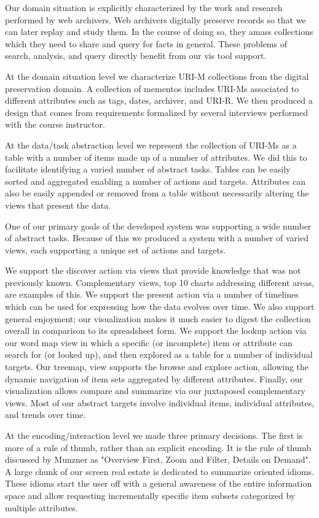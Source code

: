 \documentclass[10pt,journal,compsoc]{IEEEtran}
\begin{document}
Our domain situation is explicitly characterized by the work and research performed by web archivers. 
Web archivers digitally preserve records so that we can later replay and study them. 
In the course of doing so, they amass collections which they need to share and 
query for facts in general. These problems of search, analysis, and query directly 
benefit from our vis tool support. 

At the domain situation level we characterize URI-M collections from the digital preservation domain.
A collection of mementos includes URI-Ms associated to different attributes such as tags, dates, archiver, 
and URI-R. We then produced a design that comes from requirements formalized by several interviews performed 
with the course instructor.

At the data/task abstraction level we represent the collection of URI-Ms as a table
with a number of items made up of a number of attributes. We did this to facilitate 
identifying a varied number of abstract tasks. Tables can be easily sorted and aggregated
enabling a number of actions and targets. Attributes can also be easily appended or removed
from a table without necessarily altering the views that present the data.

One of our primary goals of the developed system was supporting a wide number of abstract tasks. Because of this
we produced a system with a number of varied views, each supporting a unique set of
actions and targets.

We support the discover action via views that provide knowledge that was not previously known.
Complementary views, top 10 charts addressing different areas, are examples of this. We support the present action via a number of timelines 
which can be used for expressing how the data evolves over time. 
We also support general enjoyment; our visualization makes it much easier to digest the
collection overall in comparison to its spreadsheet form. We support the 
lookup action via our word map view in which a specific (or incomplete) item or 
attribute can search for (or looked up), and then explored as a table for a number of individual
targets. Our treemap, view supports the browse and explore action, allowing the dynamic 
navigation of item sets aggregated by different attributes. Finally, our visualization allows 
compare and summarize via our juxtaposed complementary views. Most of our abstract targets
involve individual items, individual attributes, and trends over time.

At the encoding/interaction level we made three primary decisions. The first is 
more of a rule of thumb, rather than an explicit encoding. It is the rule of thumb 
discussed by Munzner as "Overview First, Zoom and Filter, Details on Demand". 
A large chunk of our screen real estate is dedicated to summarize oriented idioms. 
These idioms start the user off with a general awareness of the entire information space
and allow requesting incrementally specific item subsets categorized by multiple attributes.
\end{document}
